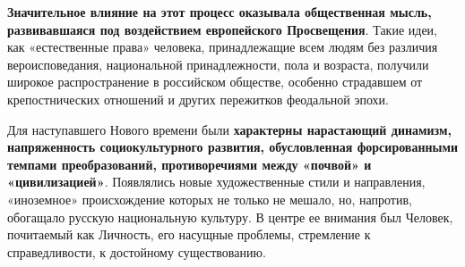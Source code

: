 \documentclass{article}
\begin{document}
\hfill

\textbf{Значительное влияние на этот процесс оказывала общественная мысль, развивавшаяся под воздействием европейского Просвещения}. Такие идеи, как «естественные права» человека, принадлежащие всем людям без различия вероисповедания, национальной принадлежности, пола и возраста, получили широкое распространение в российском обществе, особенно страдавшем от крепостнических отношений и других пережитков феодальной эпохи.

\hfill

Для наступавшего Нового времени были \textbf{характерны нарастающий динамизм, напряженность социокультурного развития, обусловленная форсированными темпами преобразований, противоречиями между «почвой» и «цивилизацией»}. Появлялись новые художественные стили и направления, «иноземное» происхождение которых не только не мешало, но, напротив, обогащало русскую национальную культуру. В центре ее внимания был Человек, почитаемый как Личность, его насущные проблемы, стремление к справедливости, к достойному существованию.
\end{document}
